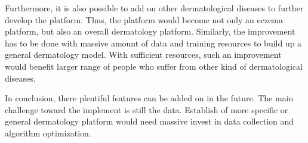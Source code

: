 Furthermore, it is also possible to add on other dermatological diseases to further develop the platform. Thus, the platform would become not only an eczema platform, but also an overall dermatology platform. Similarly, the improvement has to be done with massive amount of data and training resources to build up a general dermatology model. With sufficient resources, such an improvement would benefit larger range of people who suffer from other kind of dermatological diseases.

In conclusion, there plentiful features can be added on in the future. The main challenge toward the implement is still the data. Establish of more specific or general dermatology platform would need massive invest in data collection and algorithm optimization.